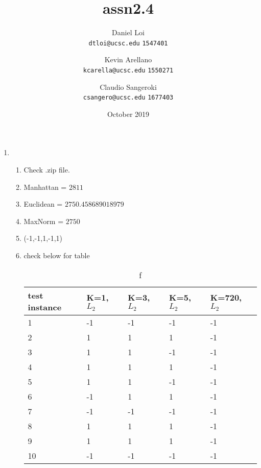 \documentclass[12pt]{article}
\title{assn2.4}
\author{
  Daniel Loi\\
  \texttt{dtloi@ucsc.edu}
  \texttt{1547401}
  \and
  Kevin Arellano\\
  \texttt{kcarella@ucsc.edu}
  \texttt{1550271}
  \and
  Claudio Sangeroki\\
  \texttt{csangero@ucsc.edu}
  \texttt{1677403}
}
\date{October 2019}
\begin{document}
\maketitle

\begin{enumerate}
    \item
    \begin{enumerate}
        \item Check .zip file.
        \item Manhattan = $2811$
        \item 
        Euclidean = $2750.458689018979$ 
        \item 
        MaxNorm = $2750$
        \item (-1,-1,1,-1,1)
        \item check below for table
        \begin{table}[]
        \caption {f} 
        \begin{tabular}{|l|l|l|l|l|}
        \hline
        test instance & K=1, $L_2$ & K=3, $L_2$ & K=5, $L_2$ & K=720, $L_2$ \\ \hline
        1             & -1         & -1         & -1         & -1           \\ \hline
        2             & 1          & 1          & 1          & -1           \\ \hline
        3             & 1          & 1          & -1         & -1           \\ \hline
        4             & 1          & 1          & 1          & -1           \\ \hline
        5             & 1          & 1          & -1         & -1           \\ \hline
        6             & -1         & 1          & 1          & -1           \\ \hline
        7             & -1         & -1         & -1         & -1           \\ \hline
        8             & 1          & 1          & 1          & -1           \\ \hline
        9             & 1          & 1          & 1          & -1           \\ \hline
        10            & -1         & -1         & -1         & -1           \\ \hline
        \end{tabular}
        \end{table}
        

\end{enumerate}
\end{enumerate}
\end{document}
